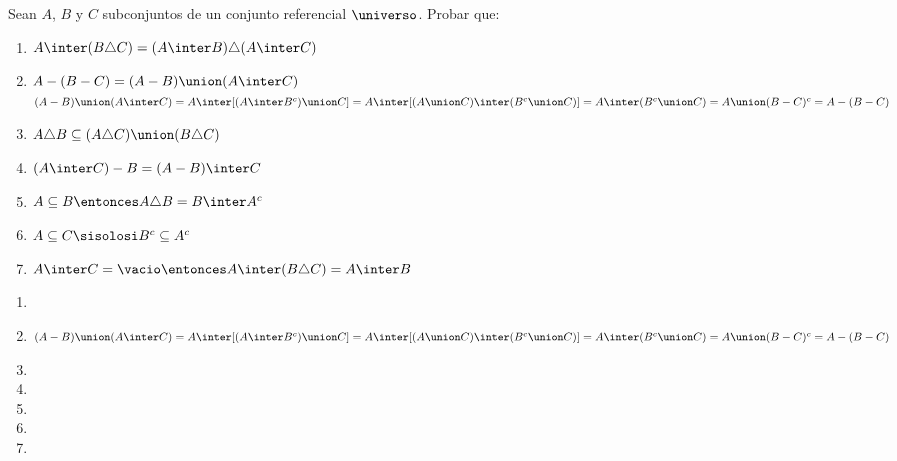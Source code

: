 \begin{enunciado}{\ejercicio}

  Sean $A$, $B$ y $C$ subconjuntos de un conjunto referencial $\universo$. Probar que:
  \begin{multicols}{2}
    \begin{enumerate}[label=\roman*)]
      \item $A \inter (B \triangle C) = (A \inter B) \triangle (A \inter C)$

      \item $A - (B - C) = (A-B) \union (A \inter C)$\\
            $(A - B) \union (A \inter C) = A \inter [(A \inter B^c) \union C] = A \inter [(A \union C) \inter (B^c \union C)] =\\
              A \inter (B^c \union C) = A \union(B-C)^c = A - (B - C)$
      \item $A \triangle B \subseteq (A \triangle C) \union (B \triangle C)$
      \item $(A \inter C ) - B = (A - B) \inter C$
      \item $A \subseteq B \entonces A \triangle B = B \inter A^c$
      \item $A \subseteq C \sisolosi B^c \subseteq A^c$
      \item $A \inter C = \vacio \entonces A \inter (B \triangle C) = A \inter B$
    \end{enumerate}
  \end{multicols}

\end{enunciado}

\begin{enumerate}[label=\roman*)]
  \item  \hacer
  \item $(A - B) \union (A \inter C) =
          A \inter [(A \inter B^c) \union C] =
          A \inter [(A \union C) \inter (B^c \union C)] =
          A \inter (B^c \union C) =
          A \union(B-C)^c =
          A - (B - C)
                $
  \item  \Hacer
  \item  \Hacer
  \item  \Hacer
  \item  \Hacer
  \item  \Hacer
\end{enumerate}
